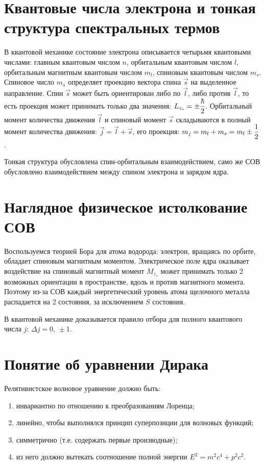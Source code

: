 \section{Квантовые числа электрона и тонкая структура спектральных термов}
В квантовой механике состояние электрона описывается четырьмя квантовыми
числами: главным квантовым числом \( n \), орбитальным квантовым числом \( l \),
орбитальным магнитным квантовым числом \( m_l \), спиновым квантовым числом
\( m_s \). Спиновое число \( m_s \) определяет проекцию вектора спина
\( \vec{s} \) на выделенное направление. Спин \( \vec{s} \) может быть
ориентирован либо по \( \vec{l} \), либо против \( \vec{l} \), то есть проекция
может принимать только два значения: \( \displaystyle L_{z_s} = \pm\frac{\hbar}{2} \).
Орбитальный момент количества движения \( \vec{l} \) и спиновый момент
\( \vec{s} \) складываются в полный момент количества движения: \( \vec{j} =
\vec{l} + \vec{s} \), его проекция: \( \displaystyle m_j = m_l + m_s = m_l \pm\frac{1}{2}
\).

Тонкая структура обусловлена спин-орбитальным взаимодействием, само же СОВ
обусловлено взаимодействием между спином электрона и зарядом ядра.

\section{Наглядное физическое истолкование СОВ}
Воспользуемся теорией Бора для атома водорода: электрон, вращаясь по орбите,
обладает спиновым магнитным моментом. Электрическое поле ядра оказывает
воздействие на спиновый магнитный момент \( M_{z_s} \) может принимать только 2
возможных ориентации в пространстве, вдоль и против магнитного момента. Поэтому
из-за СОВ каждый энергетический уровень атома щелочного металла распадается на 2
состояния, за исключением \( S \) состояния.

В квантовой механике доказывается правило отбора для полного квантового числа
\( j \): \( \Delta j = 0,\, \pm 1 \).

\section{Понятие об уравнении Дирака}
 
Релятивистское волновое уравнение должно быть:
\begin{enumerate}
    \item инвариантно по отношению к преобразованиям Лоренца;
    \item линейно, чтобы выполнялся принцип суперпозиции для волновых функций;
    \item симметрично (т.е. содержать первые производные);
    \item из него должно вытекать соотношение полной энергии \( E^2 = m^2c^4 +
p^2c^2 \).
\end{enumerate}

